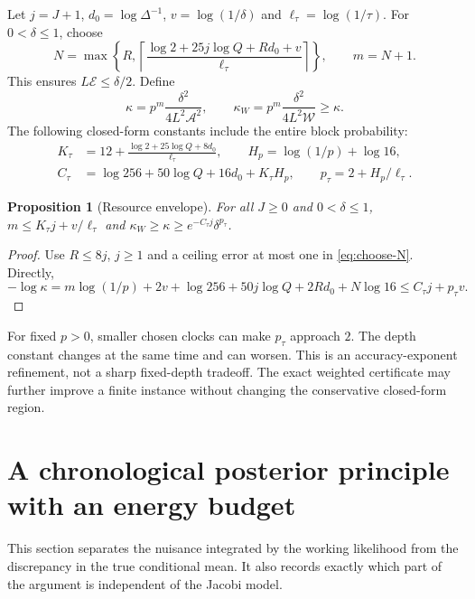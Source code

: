 \documentclass[11pt,reqno]{amsart}
\newtheorem{proposition}[theorem]{Proposition}
\theoremstyle{remark}\newtheorem{remark}[theorem]{Remark}
\begin{document}
Let $j=J+1$, $d_0=\log\Delta^{-1}$, $v=\log(1/\delta)$ and
$\ell_\tau=\log(1/\tau)$. For $0<\delta\le1$, choose
\begin{equation}
 N=\max\left\{R,\left\lceil
 \frac{\log2+25j\log Q+Rd_0+v}{\ell_\tau}\right\rceil\right\},\qquad m=N+1.
 \label{eq:choose-N}
\end{equation}
This ensures $L\mathcal E\le\delta/2$. Define
\begin{equation}
 \kappa=p^m\frac{\delta^2}{4L^2\mathcal A^2},\qquad
 \kappa_W=p^m\frac{\delta^2}{4L^2\mathcal W}\ge\kappa.
 \label{eq:kappa}
\end{equation}
The following closed-form constants include the entire block probability:
\begin{equation}
 \begin{split}
 K_\tau&=12+\frac{\log2+25\log Q+8d_0}{\ell_\tau},\qquad
 H_p=\log(1/p)+\log16,\\
 C_\tau&=\log256+50\log Q+16d_0+K_\tau H_p,\qquad
 p_\tau=2+H_p/\ell_\tau.
 \end{split}\label{eq:clock-constants}
\end{equation}

\begin{proposition}[Resource envelope]
\label{prop:envelope}
For all $J\ge0$ and $0<\delta\le1$,
$m\le K_\tau j+v/\ell_\tau$ and
$\kappa_W\ge\kappa\ge e^{-C_\tau j}\delta^{p_\tau}$.
\end{proposition}
\begin{proof}
Use $R\le8j$, $j\ge1$ and a ceiling error at most one in
\eqref{eq:choose-N}. Directly,
\[
 -\log\kappa=m\log(1/p)+2v+\log256+50j\log Q+2Rd_0+N\log16
 \le C_\tau j+p_\tau v.
\]
\end{proof}
For fixed $p>0$, smaller chosen clocks can make $p_\tau$ approach $2$.
The depth constant changes at the same time and can worsen. This is an
accuracy-exponent refinement, not a sharp fixed-depth tradeoff. The exact
weighted certificate may further improve a finite instance without changing
the conservative closed-form region.



\section{A chronological posterior principle with an energy budget}
\label{sec:energy}
This section separates the nuisance integrated by the working likelihood from
the discrepancy in the true conditional mean. It also records exactly which
part of the argument is independent of the Jacobi model.
\end{document}
